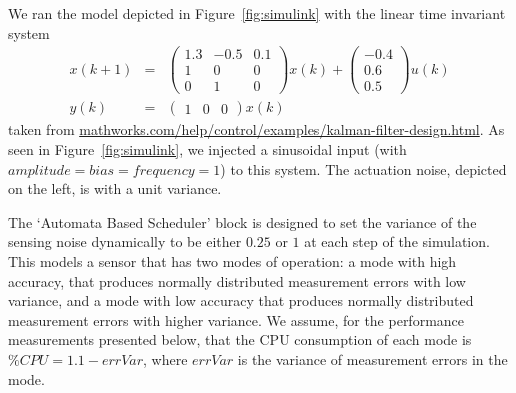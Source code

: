 \documentclass[ twoside, 12pt ]{article}
\begin{document}
We ran the model depicted in Figure~\ref{fig:simulink} with the linear time invariant system
\begin{eqnarray*}
    x(k+1) &=& \begin{pmatrix}        1.3  & -0.5  & 0.1 \\
        1    & 0     & 0 \\
        0    & 1     & 0
    \end{pmatrix}x(k)+ 
    \begin{pmatrix}
        -0.4 \\
        0.6\\
        0.5\end{pmatrix} u(k) \\
    y(k)&=& \begin{pmatrix}1 & 0 &0\end{pmatrix}x(k)
\end{eqnarray*}
taken from \url{mathworks.com/help/control/examples/kalman-filter-design.html}. As seen in Figure~\ref{fig:simulink}, we injected a sinusoidal input (with $amplitude=bias=frequency=1$) to this system. 
The actuation noise, depicted on the left, is with a unit variance. 

The `Automata Based Scheduler' block is designed to set the variance of the sensing noise dynamically to be either $0.25$ or $1$ at each step of the simulation. This models a sensor that has two modes of operation: a mode with high accuracy, that produces normally distributed measurement errors with low variance, and a mode with low accuracy that produces normally distributed measurement errors with higher variance. We assume, for the performance measurements presented below, that the CPU consumption of each mode is $\%CPU=1.1-errVar$, where $errVar$ is the variance of measurement errors in the mode.
\end{document}
